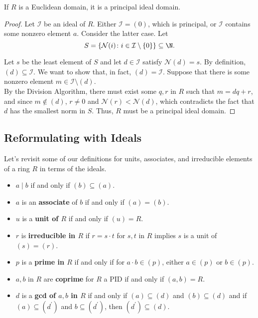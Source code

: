 \documentclass[11pt]{article}
\begin{document}
\begin{theorem}
If $R$ is a Euclidean domain, it is a principal ideal domain.
\end{theorem}

\begin{proof}
Let $\mathcal{I} $ be an ideal of $R$. Either $\mathcal{I} = (0)$, which is principal, or $\mathcal{I} $ contains some nonzero element $a$.
Consider the latter case. Let 
\[
    S = \{ \mathcal{N}(i) \colon i \in \mathcal{I} \setminus \{ 0 \}  \} \subseteq \N.
\]

Let $s$ be the least element of $S$ and let $d \in \mathcal{I}$ satisfy $\mathcal{N} (d) = s$. By definition, $(d) \subseteq \mathcal{I}$. 
We want to show that, in fact, $(d) = \mathcal{I}$. Suppose that there is some nonzero element $m \in \mathcal{I} \setminus (d).$ \\

By the Division Algorithm, there must exist some $q, r$ in $R$ such that $m = dq + r$, and since $m \notin (d)$, $r \neq 0$ and $\mathcal{N} (r) < \mathcal{N} (d)$, which
contradicts the fact that $d$ has the smallest norm in $S$. Thus, $R$ must be a principal ideal domain.
\end{proof}

\subsection{Reformulating with Ideals}
Let's revisit some of our definitions for units, associates, and irreducible elements of a ring $R$ in terms of the ideals.

\begin{definition}
    \hfill
    \vspace{-0.75cm}
    \begin{itemize}
        \item $a \mid b$ if and only if $(b) \subseteq (a)$.
        \item $a$ is an \textbf{associate} of $b$ if and only if $(a) = (b)$.
        \item $u$ is a \textbf{unit of $R$} if and only if $(u) = R$.
        \item $r$ is \textbf{irreducible in $R$} if $r = s \cdot t$ for $s, t$ in $R$ implies $s$ is a unit of $(s) = (r)$.
        \item $p$ is a \textbf{prime in $R$} if and only if for $a \cdot b \in (p)$, either $a \in (p)$ or $b \in (p)$.
        \item $a, b$ in $R$ are \textbf{coprime} for $R$ a PID if and only if $(a, b) = R$.
        \item $d$ is a \textbf{gcd of $a, b$ in $R$} if and only if $(a) \subseteq  (d)$ and $(b) \subseteq (d)$ and 
        if $(a) \subseteq (d^{\prime})$ and $b \subseteq (d^{\prime})$, then $(d^{\prime}) \subseteq (d)$.
    \end{itemize}
\end{definition}
\end{document}
